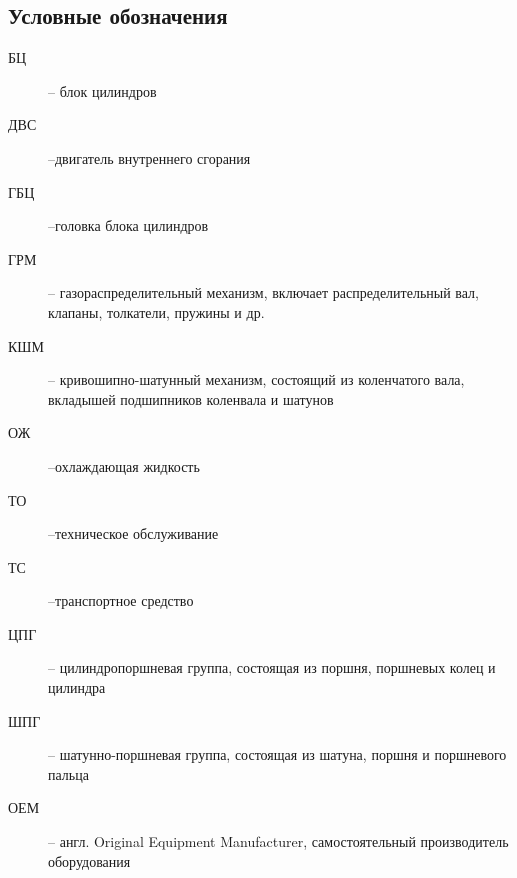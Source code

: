 \subsection{Условные обозначения}
%
\begin{description}
%	 
\item
[БЦ] -- блок цилиндров
\item
[ДВС] --двигатель внутреннего сгорания
\item
[ГБЦ] --головка блока цилиндров
\item
[ГРМ] -- газораспределительный механизм, включает распределительный вал,
клапаны, толкатели, пружины и др.
\item
[КШМ] -- кривошипно-шатунный механизм, состоящий из коленчатого вала,
вкладышей подшипников коленвала и шатунов
\item
[ОЖ] --охлаждающая жидкость 
\item
[ТО] --техническое обслуживание
\item
[ТС] --транспортное средство
\item
[ЦПГ] -- цилиндропоршневая группа, состоящая из поршня, поршневых колец и
цилиндра
\item
[ШПГ] -- шатунно-поршневая группа, состоящая из шатуна, поршня и поршневого
пальца
\item[ ОЕМ] -- англ. Original Equipment Manufacturer, самостоятельный производитель оборудования
%
\end{description}

